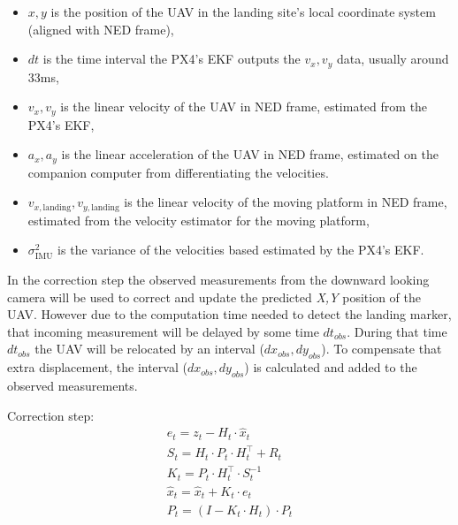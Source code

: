 \documentclass[conference, onecolumn, draftclsnofoot]{IEEEtran}
\begin{document}
\begin{itemize}
\item  \(x, y \) is the position of the UAV in the landing site's local 
coordinate system (aligned with NED frame), 
\item \(dt\) is the time interval the PX4's EKF outputs the \(v_x, v_y\) data, 
usually around 33ms, 
\item \(v_x, v_y\) is the linear velocity of the UAV in NED frame, 
estimated from the PX4's EKF,


\item \(a_x, a_y\) is the linear acceleration of the UAV in NED frame, 
estimated on the companion computer from differentiating the velocities.


\item \(v_{x,\textrm{landing}}, v_{y,\textrm{landing}}\) is the linear 
velocity of the moving platform in NED frame, estimated from the velocity 
estimator for the moving platform,


\item \(\sigma^{2}_{\textrm{IMU}}\) is the variance of the velocities based 
estimated by the PX4's EKF.
\end{itemize}

In the correction step the observed measurements from the downward
looking camera will be used to correct and update the predicted
\emph{X,Y} position of the UAV. However due to the computation time
needed to detect the landing marker, that incoming measurement will be
delayed by some time \(dt_{obs}\). During that time \(dt_{obs}\) the
UAV will be relocated by an interval (\(dx_{obs}, dy_{obs}\)). To
compensate that extra displacement, the interval
(\(dx_{obs}, dy_{obs}\)) is calculated and added to the observed
measurements.

Correction step:
\begin{equation}
    \begin{array}{l}
    
    e_{t} = z_{t} - H_{t} \cdot \hat{x}_{t} \\
    S_{t} = H_{t} \cdot P_{t} \cdot H_{t}^\top + R_{t} \\
    K_{t} = P_{t} \cdot H_{t}^\top \cdot S_{t}^{-1} \\
    \hat{x}_{t} = \hat{x}_{t} + K_{t} \cdot e_{t} \\
    P_{t} = (I - K_{t} \cdot H_{t}) \cdot P_{t}
    \end{array}
\end{equation}
\end{document}
